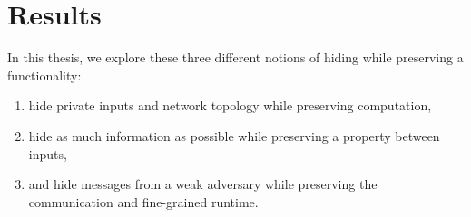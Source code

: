 \section{Results}
In this thesis, we explore these three different notions of hiding while preserving a functionality:
\begin{enumerate}
	\item hide private inputs and network topology while preserving computation,
	\item hide as much information as possible while preserving a property between inputs,
	\item and hide messages from a weak adversary while preserving the communication and fine-grained runtime.
\end{enumerate}

